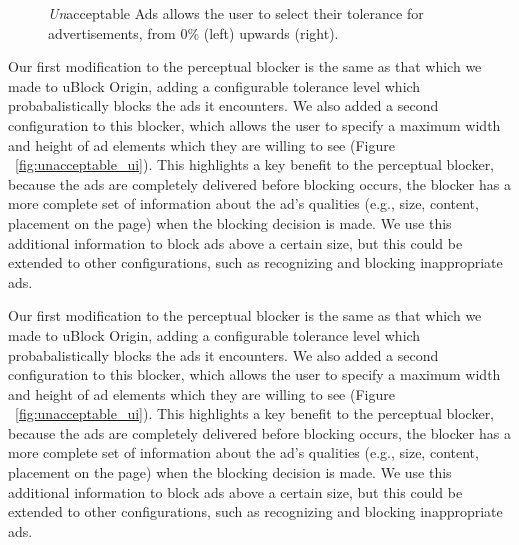\begin{figure}[t]
\hfill
{}
\hfill
{}
\hfill
\caption{\textit{Un}acceptable Ads allows the user to select their tolerance for advertisements, from 0\% (left) upwards (right).}
\label{fig:unacceptable}
\end{figure}

Our first modification to the perceptual blocker is the same as that which we made to uBlock Origin, adding a configurable tolerance level which probabalistically blocks the ads it encounters.
We also added a second configuration to this blocker, which allows the user to specify a maximum width and height of ad elements which they are willing to see (Figure ~\ref{fig:unacceptable_ui}).
This highlights a key benefit to the perceptual blocker, because the ads are completely delivered before blocking occurs, the blocker has a more complete set of information about the ad's qualities (e.g., size, content, placement on the page) when the blocking decision is made.
We use this additional information to block ads above a certain size, but this could be extended to other configurations, such as recognizing and blocking inappropriate ads.


Our first modification to the perceptual blocker is the same as that which we made to uBlock Origin, adding a configurable tolerance level which probabalistically blocks the ads it encounters.
We also added a second configuration to this blocker, which allows the user to specify a maximum width and height of ad elements which they are willing to see (Figure ~\ref{fig:unacceptable_ui}).
This highlights a key benefit to the perceptual blocker, because the ads are completely delivered before blocking occurs, the blocker has a more complete set of information about the ad's qualities (e.g., size, content, placement on the page) when the blocking decision is made.
We use this additional information to block ads above a certain size, but this could be extended to other configurations, such as recognizing and blocking inappropriate ads.


